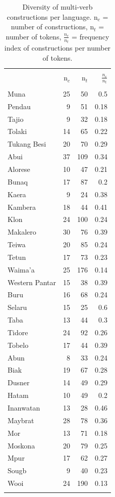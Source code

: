 \begin{table}
\begin{footnotesize}
\begin{tabular}{l r r r}
  \lsptoprule
  \\
& n$_c$ & n$_t$ & $\frac{n_c}{n_t}$ \\ 
\\
  \hline
Muna	& 25 &	50 &	0.5	 \\
Pendau	& 9 &		51 &	0.18 \\
Tajio	& 9 &		32 &	0.18 \\ 
Tolaki	& 14 &	65 &	0.22 \\
Tukang Besi &	20 &	70 &	0.29 \\ \hline
Abui	& 37 &	109 &	0.34 \\
Alorese	& 10 &	47 &	0.21 \\
Bunaq	& 17 &	87 &	0.2	 \\
Kaera	& 9 &		24 &	0.38 \\
Kambera	& 18 &	44 &	0.41 \\
Klon	& 24 &	100 &	0.24 \\
Makalero &	30 &	76 &	0.39 \\
Teiwa	& 20 &	85 &	0.24 \\
Tetun	& 17 &	73 &	0.23 \\
Waima'a	& 25 &	176 &	0.14 \\
Western Pantar	& 15 &	38 &	0.39 \\ \hline
Buru	& 16 &	68 &	0.24 \\
Selaru	& 15 &	25 &	0.6	 \\
Taba	& 13 &	44 &	0.3	 \\
Tidore	& 24 &	92 &	0.26 \\
Tobelo	& 17 &	44 &	0.39 \\ \hline
Abun	& 8 &	33 &	0.24 \\
Biak	& 19 &	67 &	0.28 \\
Dusner	& 14 &	49 &	0.29 \\
Hatam	& 10 &	49 &	0.2	 \\
Inanwatan	& 13 &	28 &	0.46 \\
Maybrat	& 28 &	78 &	0.36 \\
Mor	& 13 &	71 &	0.18	 \\
Moskona	& 20 &	79 &	0.25 \\
Mpur	& 17 &	62 &	0.27 \\
Sougb	& 9 &	40 &	0.23 \\
Wooi	& 24 &	190 &	0.13 \\
\lspbottomrule
\end{tabular}
\end{footnotesize}
\caption[Diversity of multi-verb constructions per language]{Diversity of multi-verb constructions per language. n$_c$ = number of constructions, n$_t$ = number of tokens, $\frac{n_c}{n_t}$ = frequency index of constructions per number of tokens.}
\label{table:diversity_language}
\end{table}

